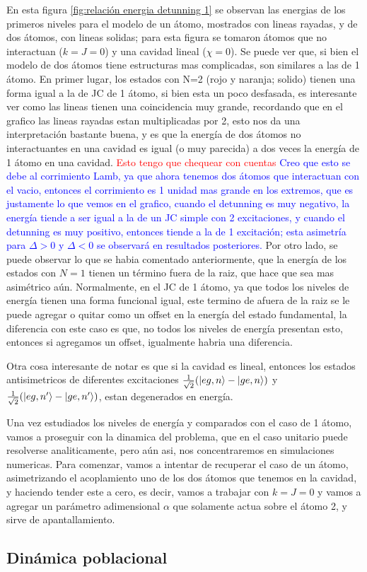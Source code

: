 En esta figura \ref{fig:relación energia detunning 1} se observan las energias de los primeros niveles para el modelo de un átomo, mostrados con lineas rayadas, y de dos átomos, con lineas solidas; para esta figura se tomaron átomos que no interactuan ($k=J=0$) y una cavidad lineal ($\chi=0$). Se puede ver que, si bien el modelo de dos átomos tiene estructuras mas complicadas, son similares a las de 1 átomo. En primer lugar, los estados con N=2 (rojo y naranja; solido) tienen una forma igual a la de JC de 1 átomo, si bien esta un poco desfasada, es interesante ver como las lineas tienen una coincidencia muy grande, recordando que en el grafico las lineas rayadas estan multiplicadas por 2, esto nos da una interpretación bastante buena, y es que la energía de dos átomos no interactuantes en una cavidad es igual (o muy parecida) a dos veces la energía de 1 átomo en una cavidad. \textcolor{red}{Esto tengo que chequear con cuentas} \textcolor{blue}{Creo que esto se debe al corrimiento Lamb, ya que ahora tenemos dos átomos que interactuan con el vacio, entonces el corrimiento es 1 unidad mas grande en los extremos, que es justamente lo que vemos en el grafico, cuando el detunning es muy negativo, la energ\'ia tiende a ser igual a la de un JC simple con 2 excitaciones, y cuando el detunning es muy positivo, entonces tiende a la de 1 excitaci\'on; esta asimetr\'ia para $\Delta>0$ y $\Delta<0$ se observar\'a en resultados posteriores.} Por otro lado, se puede observar lo que se habia comentado anteriormente, que la energ\'ia de los estados con $N=1$ tienen un t\'ermino fuera de la raiz, que hace que sea mas asim\'etrico a\'un. Normalmente, en el JC de 1 átomo, ya que todos los niveles de energía tienen una forma funcional igual, este termino de afuera de la raiz se le puede agregar o quitar como un offset en la energía del estado fundamental, la diferencia con este caso es que, no todos los niveles de energía presentan esto, entonces si agregamos un offset, igualmente habria una diferencia. 

Otra cosa interesante de notar es que si la cavidad es lineal, entonces los estados antisimetricos de diferentes excitaciones $\frac{1}{\sqrt{2}}(\ket{eg,n}-\ket{ge,n})$ y $\frac{1}{\sqrt{2}}(\ket{eg,n'}-\ket{ge,n'})$, estan degenerados en energía.

Una vez estudiados los niveles de energía y comparados con el caso de 1 átomo, vamos a proseguir con la dinamica del problema, que en el caso unitario puede resolverse analiticamente, pero a\'un asi, nos concentraremos en simulaciones numericas.
Para comenzar, vamos a intentar de recuperar el caso de un átomo, asimetrizando el acoplamiento uno de los dos átomos que tenemos en la cavidad, y haciendo tender este a cero, es decir, vamos a trabajar con $k=J=0$ y vamos a agregar un parámetro adimensional $\alpha$ que solamente actua sobre el átomo 2, y sirve de apantallamiento. 

\subsection{Dinámica poblacional}

